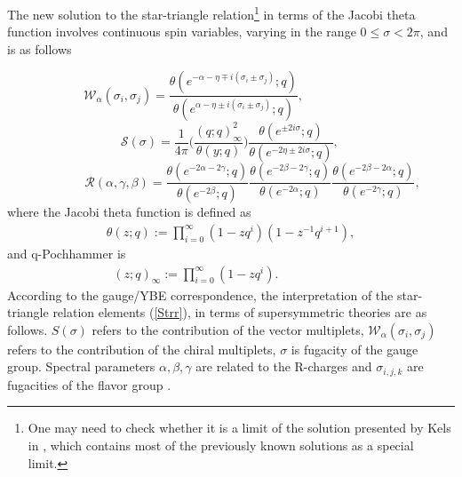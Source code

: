 \documentclass[a4paper,11pt]{article}%
\numberwithin{equation}{section}
\begin{document}
The new solution to the star-triangle  relation\footnote{One may need to check whether it is a limit of the solution presented by Kels in \cite{Kels:2015bda}, which contains most of the previously known solutions as a special limit.} in terms of the Jacobi theta function involves continuous spin variables, varying in the range $0\leq \sigma< 2\pi$, and is as follows
 
 \begin{equation}\label{IB-W}\nonumber
     \,\mathcal{W}_{\alpha}(\sigma_i,\sigma_j)=\frac{\theta( e^{-\alpha-\eta\mp i(\sigma_i\pm \sigma_j)};q)}{\theta(e^{\alpha-\eta\pm i(\sigma_i\pm \sigma_j)};q)},\qquad\qquad\qquad\,
\end{equation}
\begin{equation}
     \mathcal{S}(\sigma)=\frac{1}{4\pi}\Big(\frac{(q;q)^2_{\infty}}{\theta(y;q)}\Big)  \frac{\theta(e^{\pm 2i\sigma};q)}{\theta(e^{-2\eta\pm 2i\sigma};q)},\, 
\end{equation}
\begin{equation}\nonumber
  \qquad \qquad \mathcal{ R}(\alpha,\gamma,\beta)= \frac{\theta(e^{-2\alpha-2\gamma};q)}{\theta(e^{-2\beta};q)} \frac{\theta(e^{-2\beta-2\gamma};q)}{\theta(e^{-2\alpha};q)} \frac{\theta(e^{-2\beta-2\alpha};q)}{\theta(e^{-2\gamma};q)},\,\,\,
\end{equation}
where the Jacobi theta function is defined as
\begin{align} \label{theta}
    \theta(z;q):= \prod_{i=0}^{\infty}(1-zq^i)(1-z^{-1}q^{i+1}),
\end{align}
and  q-Pochhammer is 
\begin{align}\label{q-Poch}
  (z;q)_\infty:=\prod_{i=0}^{\infty}(1-zq^i).\qquad \qquad\quad\,\,\,\,
\end{align}
 According to the gauge/YBE correspondence, the interpretation of the star-triangle relation  elements (\ref{Strr}), in terms of supersymmetric theories are as follows. $S(\sigma)$ refers to the contribution of the vector multiplets, $\mathcal{W}_\alpha(\sigma_i,\sigma_j)$ refers to the contribution of the chiral multiplets, $\sigma$ is fugacity of the gauge group. Spectral parameters $\alpha, \beta, \gamma$ are related to the R-charges and $\sigma_{i,j,k}$ are fugacities of the flavor group \cite{Yamazaki:2012cp,Terashima:2012cx}.
\end{document}
